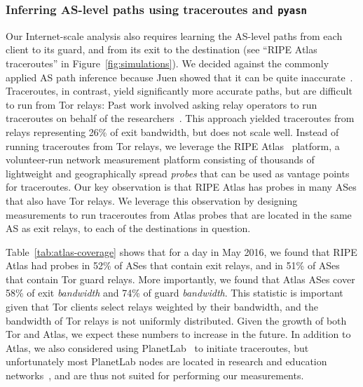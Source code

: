\subsubsection{Inferring AS-level paths using traceroutes and {\tt pyasn}}

Our Internet-scale analysis also requires learning the AS-level paths from each
client to its guard, and from its exit to the destination (see ``RIPE Atlas
traceroutes'' in Figure~\ref{fig:simulations}).  We decided against the commonly
applied AS path inference because Juen \ea showed that it can be quite
inaccurate~\cite{Juen2015a}.  Traceroutes, in contrast, yield significantly more
accurate paths, but are difficult to run from Tor relays:  Past work involved
asking relay operators to run traceroutes on behalf of the
researchers~\cite[\S~4]{Juen2015a}.  This approach yielded traceroutes from
relays representing 26\% of exit bandwidth, but does not scale well.  Instead of
running traceroutes from Tor relays, we leverage the RIPE Atlas~\cite{atlas}
platform, a volunteer-run network measurement platform consisting of thousands
of lightweight and geographically spread \emph{probes} that can be used as
vantage points for traceroutes.  Our key observation is that RIPE Atlas has
probes in many ASes that also have Tor relays.  We leverage this observation by
designing measurements to run traceroutes from Atlas probes that are located in
the same AS as exit relays, to each of the destinations in question.

Table~\ref{tab:atlas-coverage} shows that for a day in May 2016, we found that
RIPE Atlas had probes in 52\% of ASes that contain exit relays, and in 51\% of
ASes that contain Tor guard relays.  More importantly, we found that Atlas ASes
cover 58\% of exit \emph{bandwidth} and 74\% of guard \emph{bandwidth}.  This
statistic is important given that Tor clients select relays weighted by their
bandwidth, and the bandwidth of Tor relays is not uniformly distributed.  Given
the growth of both Tor and Atlas, we expect these numbers to increase in the
future.  In addition to Atlas, we also considered using
PlanetLab~\cite{planetlab} to initiate traceroutes, but unfortunately most
PlanetLab nodes are located in research and education
networks~\cite{Banerjee2004a}, and are thus not suited for performing our
measurements.


